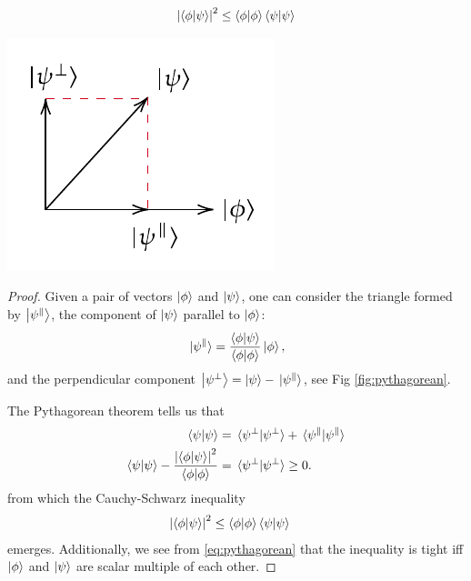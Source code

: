 \begin{theorem}\leavevmode\label{thm:CS-ineq}

$$\abs{\braket{\phi}{\psi}}^2 \le \braket{\phi} \braket{\psi}$$
\end{theorem}

\begin{marginfigure}
	\includegraphics[scale=1]{fig/pythagorean.pdf}
	\caption{}
	\label{fig:pythagorean}
\end{marginfigure}
\begin{proof}
	Given a pair of vectors $\ket{\phi}$ and $\ket{\psi}$, one can consider the triangle formed by $\ket{\psi^{\parallel}}$, the component of $\ket{\psi}$ parallel to $\ket{\phi}$:
	\begin{align}
		\ket*{\psi^{\parallel}} = 
		\frac{\left\langle \phi|\psi \right\rangle}{\left\langle \phi|\phi \right\rangle}\ket{\phi}, 
	\end{align}
	and the perpendicular component $\ket{\psi^{\perp}} = \ket{\psi} - \ket*{\psi^{\parallel}}$, see Fig \ref{fig:pythagorean}.
	
	
	The Pythagorean theorem tells us that
	\begin{align}
		\braket{\psi}  &= \braket*{\psi^{\perp}} + \braket*{\psi^{\parallel}} \\
		\braket{\psi} - \frac{\abs{\braket{\phi}{\psi}}^2}{\braket{\phi}} &= \braket*{\psi^{\perp}} \ge 0
		\label{eq:pythagorean}.
	\end{align}
	from which the Cauchy-Schwarz inequality
	\begin{align}
		\abs{\left\langle \phi|\psi \right\rangle}^2 &\le \left\langle \phi|\phi \right\rangle\left\langle \psi|\psi \right\rangle
	\end{align}
emerges.
	Additionally, we see from \eqref{eq:pythagorean} that the inequality is tight iff $\ket{\phi}$ and $\ket{\psi}$ are scalar multiple of each other.
\end{proof}

